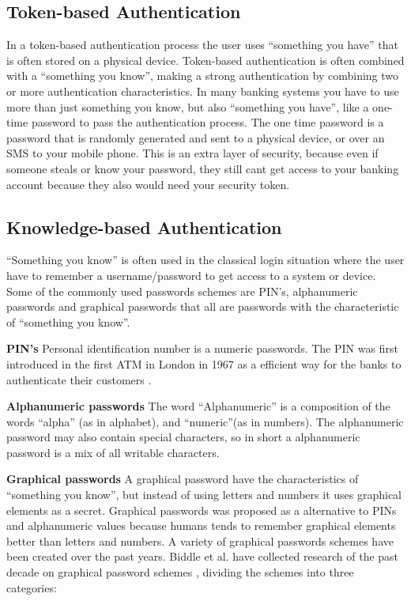     \subsection{Token-based Authentication}
    In a token-based authentication process the user uses ``something you have'' that is often stored on a physical device. Token-based authentication is often combined with a ``something you know'', making a strong authentication by combining two or more authentication characteristics. In many banking systems you have to use more than just something you know, but also ``something you have'', like a one-time password to pass the authentication process. The one time password is a password that is randomly generated and sent to a physical device, or over an SMS to your mobile phone. This is an extra layer of security, because even if someone steals or know your password, they still cant get access to your banking account because they also would need your security token.

    \subsection{Knowledge-based Authentication}
    ``Something you know'' is often used in the classical login situation where the user have to remember a username/password to get access to a system or device. Some of the commonly used passwords schemes are PIN's, alphanumeric passwords and graphical passwords that all are passwords with the characteristic of ``something you know''.

      {\bf PIN's} Personal identification number is a numeric passwords. The PIN was first introduced in the first ATM in London in 1967 as a efficient way for the banks to authenticate their customers \cite{Bonneau1}.      

      {\bf Alphanumeric passwords}
      The word ``Alphanumeric'' is a composition of the words ``alpha'' (as in alphabet), and ``numeric''(as in numbers). The alphanumeric password may also contain special characters, so in short a alphanumeric password is a mix of all writable characters.

      {\bf Graphical passwords}
      A graphical password have the characteristics of ``something you know'', but instead of using letters and numbers it uses graphical elements as a secret. Graphical passwords was proposed as a alternative to PINs and alphanumeric values because humans tends to remember graphical elements better than letters and numbers. A variety of graphical passwords schemes have been created over the past years. Biddle et al. have collected research of the past decade on graphical password schemes \cite{Biddle}, dividing the schemes into three categories: 

